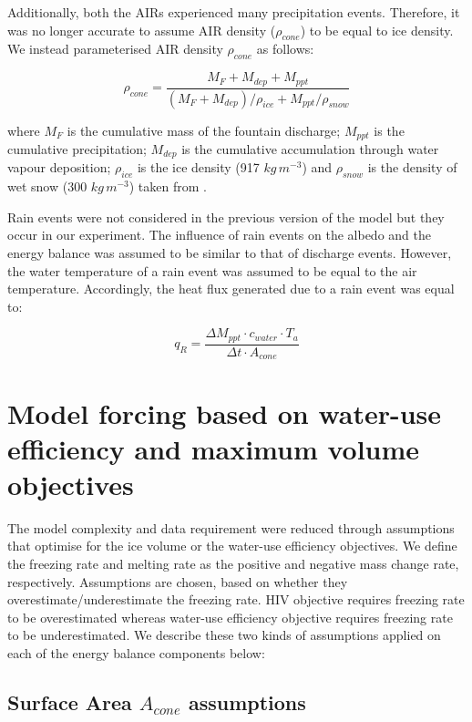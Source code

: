 \documentclass[tc, manuscript]{copernicus}
\begin{document}
Additionally, both the AIRs experienced many precipitation events. Therefore, it was no longer accurate to
assume AIR density ($\rho_{cone}$) to be equal to ice density. We instead parameterised AIR density $\rho_{cone}$ as follows:

\begin{equation}
  \rho_{cone} = \frac{M_{F} + M_{dep} + M_{ppt}}{(M_{F} + M_{dep})/\rho_{ice} + M_{ppt}/\rho_{snow}}
\end{equation}

where $M_F$ is the cumulative mass of the fountain discharge; $M_{ppt}$ is the cumulative precipitation;
$M_{dep}$ is the cumulative accumulation through water vapour deposition; $\rho_{ice}$ is the ice density (917
$kg\,m^{-3}$) and $\rho_{snow}$ is the density of wet snow (300 $kg\,m^{-3}$) taken from
\cite{cuffeyPhysicsGlaciers2010} .

Rain events were not considered in the previous version of the model but they occur in our experiment. The
influence of rain events on the albedo and the energy balance was assumed to be similar to that of discharge
events. However, the water temperature of a rain event was assumed to be equal to the air temperature.
Accordingly, the heat flux generated due to a rain event was equal to:

\begin{equation}
  q_{R} = \frac{\Delta M_{ppt} \cdot c_{water} \cdot T_{a}}{\Delta t \cdot A_{cone}}
\end{equation}

\section{Model forcing based on water-use efficiency and maximum volume objectives} \label{sec:SEB}

The model complexity and data requirement \citep{balasubramanianInfluenceMeteorologicalConditions2022} were
reduced through assumptions that optimise for the ice volume or the water-use efficiency objectives. We define
the freezing rate and melting rate as the positive and negative mass change rate, respectively. Assumptions are
chosen, based on whether they overestimate/underestimate the freezing rate. HIV objective requires freezing rate
to be overestimated whereas water-use efficiency objective requires freezing rate to be underestimated. We
describe these two kinds of assumptions applied on each of the energy balance components below: 

\subsection{Surface Area $A_{cone}$ assumptions}
\end{document}
